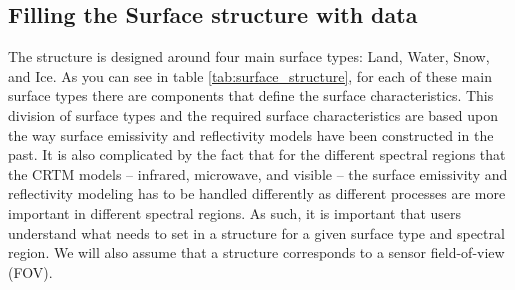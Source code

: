 \subsection{Filling the Surface structure with data}
\label{sec:fill_step-surface}
The \hyperref[sec:surface_structure]{\Surface} structure is designed around four main surface types: Land, Water, Snow, and Ice. As you can see in table \ref{tab:surface_structure}, for each of these main surface types there are components that define the surface characteristics. This division of surface types and the required surface characteristics are based upon the way surface emissivity and reflectivity models have been constructed in the past. It is also complicated by the fact that for the different spectral regions that the CRTM models -- infrared, microwave, and visible -- the surface emissivity and reflectivity modeling has to be handled differently as different processes are more important in different spectral regions. As such, it is important that users understand what needs to set in a \hyperref[sec:surface_structure]{\Surface} structure for a given surface type and spectral region. We will also assume that a \hyperref[sec:surface_structure]{\Surface} structure corresponds to a sensor field-of-view (FOV).

